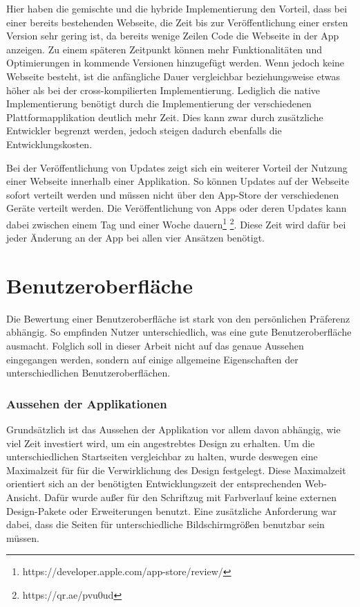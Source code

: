 Hier haben die gemischte und die hybride Implementierung den Vorteil, dass bei einer bereits bestehenden Webseite, die Zeit bis zur Veröffentlichung einer ersten Version sehr gering ist, da bereits wenige Zeilen Code die Webseite in der App anzeigen. Zu einem späteren Zeitpunkt können mehr Funktionalitäten und Optimierungen in kommende Versionen hinzugefügt werden. Wenn jedoch keine Webseite besteht, ist die anfängliche Dauer vergleichbar beziehungsweise etwas höher als bei der cross-kompilierten Implementierung. Lediglich die native Implementierung benötigt durch die Implementierung der verschiedenen Plattformapplikation deutlich mehr Zeit. Dies kann zwar durch zusätzliche Entwickler begrenzt werden, jedoch steigen dadurch ebenfalls die Entwicklungskosten.

Bei der Veröffentlichung von Updates zeigt sich ein weiterer Vorteil der Nutzung einer Webseite innerhalb einer Applikation. So können Updates auf der Webseite sofort verteilt werden und müssen nicht über den App-Store der verschiedenen Geräte verteilt werden. Die Veröffentlichung von Apps oder deren Updates kann dabei zwischen einem Tag und einer Woche dauern\footnote{https://developer.apple.com/app-store/review/} \footnote{https://qr.ae/pvu0ud}. Diese Zeit wird dafür bei jeder Änderung an der App bei allen vier Ansätzen benötigt.

\section{Benutzeroberfläche}
Die Bewertung einer Benutzeroberfläche ist stark von den persönlichen Präferenz abhängig. So empfinden Nutzer unterschiedlich, was eine gute Benutzeroberfläche ausmacht. Folglich soll in dieser Arbeit nicht auf das genaue Aussehen eingegangen werden, sondern auf einige allgemeine Eigenschaften der unterschiedlichen Benutzeroberflächen.

\subsubsection{Aussehen der Applikationen}
Grundsätzlich ist das Aussehen der Applikation vor allem davon abhängig, wie viel Zeit investiert wird, um ein angestrebtes Design zu erhalten. Um die unterschiedlichen Startseiten vergleichbar zu halten, wurde deswegen eine Maximalzeit für für die Verwirklichung des Design festgelegt. Diese Maximalzeit orientiert sich an der benötigten Entwicklungszeit der entsprechenden Web-Ansicht. Dafür wurde außer für den Schriftzug mit Farbverlauf keine externen Design-Pakete oder Erweiterungen benutzt. Eine zusätzliche Anforderung war dabei, dass die Seiten für unterschiedliche Bildschirmgrößen benutzbar sein müssen.

